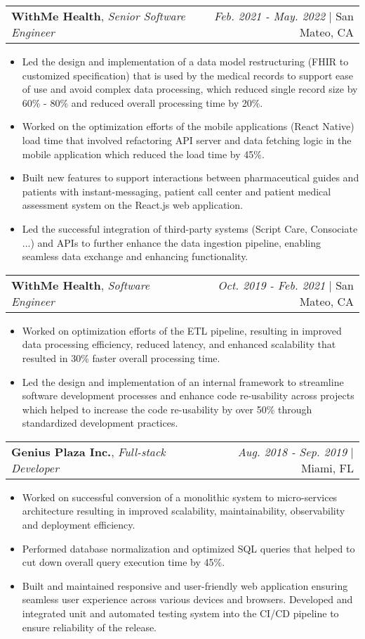 \documentclass[letterpaper,11pt]{article}
\makeatletter
\newcommand{\experience}[4]{
  \vspace{-1pt}\item
    \begin{tabular*}{0.97\textwidth}{l@{\extracolsep{\fill}}r}
      \textbf{#1}, \textit{\small #3} & \textit{\small #4} | #2 \\
    \end{tabular*}\vspace{-5pt}
}
\newcommand{\achievement}[1]{\item\small{#1}}
\newcommand{\sectionStart}{\begin{itemize}[leftmargin=*]}
\newcommand{\sectionEnd}{\end{itemize}}
\makeatother
\begin{document}
    \experience
      {WithMe Health}{San Mateo, CA}
      {Senior Software Engineer}{Feb. 2021 - May. 2022}
      \sectionStart
        \achievement{Led the design and implementation of a data model restructuring (FHIR to customized specification) that is used by the medical records to support ease of use and avoid complex data processing, which reduced single record size by 60\% - 80\% and reduced overall processing time by 20\%.}
        \achievement{Worked on the optimization efforts of the mobile applications (React Native) load time that involved refactoring API server and data fetching logic in the mobile application which reduced the load time by 45\%.}
        \achievement{Built new features to support interactions between pharmaceutical guides and patients with instant-messaging, patient call center and patient medical assessment system on the React.js web application.}
        \achievement{Led the successful integration of third-party systems (Script Care, Consociate ...) and APIs to further enhance the data ingestion pipeline, enabling seamless data exchange and enhancing functionality.}
      \sectionEnd

    \experience
      {WithMe Health}{San Mateo, CA}
      {Software Engineer}{Oct. 2019 - Feb. 2021}
      \sectionStart
        \achievement{Worked on optimization efforts of the ETL pipeline, resulting in improved data processing efficiency, reduced latency, and enhanced scalability that resulted in 30\% faster overall processing time.}
        \achievement{Led the design and implementation of an internal framework to streamline software development processes and enhance code re-usability across projects which helped to increase the code re-usability by over 50\% through standardized development practices.}
      \sectionEnd

    \experience
      {Genius Plaza Inc.}{Miami, FL}
      {Full-stack Developer}{Aug. 2018 - Sep. 2019}
      \sectionStart
        \achievement{Worked on successful conversion of a monolithic system to micro-services architecture resulting in improved scalability, maintainability, observability and deployment efficiency.}
        \achievement{Performed database normalization and optimized SQL queries that helped to cut down overall query execution time by 45\%.}
        \achievement{Built and maintained responsive and user-friendly web application ensuring seamless user experience across various devices and browsers. Developed and integrated unit and automated testing system into the CI/CD pipeline to ensure reliability of the release.}
      \sectionEnd
\end{document}
